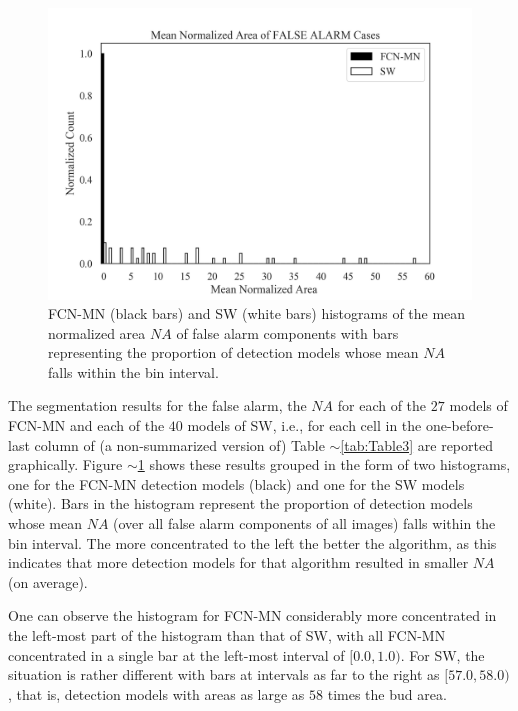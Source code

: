 \documentclass[a4paper,authoryear,review]{elsarticle}
\begin{document}
	
	
	
	
	
	
	
	\begin{figure}%
		\centering
		\includegraphics[width=\textwidth]{figures/Figure6.png}%
		\caption{
			FCN-MN (black bars) and SW (white bars) histograms of the mean normalized area $NA$ of false alarm components with bars representing the proportion of detection models whose mean $NA$ falls within the bin interval.
		}
		\label{fig:Figure6}
	\end{figure}
	
	
	The segmentation results for the false alarm, the $NA$  for each of the $27$ models of FCN-MN and each of the $40$ models of SW, i.e., for each cell in the  one-before-last column of (a non-summarized version of) Table $\sim$\ref{tab:Table3} are reported graphically. Figure $\sim$\ref{fig:Figure6} shows these results grouped in the form of two histograms, one for the FCN-MN detection models (black) and one for the SW models  (white). Bars in the histogram represent the proportion of detection models whose mean $NA$ (over all false alarm components of all images) falls within the bin interval. The more concentrated to the left the better the algorithm, as this indicates that more detection models for that algorithm resulted in smaller $NA$ (on average).
	
	One can observe the histogram for FCN-MN considerably more concentrated in the left-most part of the histogram than that of SW, with all FCN-MN concentrated in a single bar at the left-most interval of $[0.0, 1.0)$. For SW, the situation is rather different with bars at intervals as far to the right as $[57.0, 58.0)$, that is, detection models with areas as large as $58$ times the bud area. 
	
\end{document}

